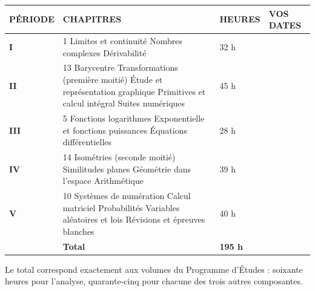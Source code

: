 \vspace{0.6em}
\begin{center}
\setlength{\tabcolsep}{6pt}
\renewcommand{\arraystretch}{1.5}
\begin{tabular}{@{}L{1.5cm} L{6.3cm} L{1.6cm} L{2.5cm}@{}}
\toprule
\textsf{\footnotesize\bfseries PÉRIODE} &
\textsf{\footnotesize\bfseries CHAPITRES} &
\textsf{\footnotesize\bfseries HEURES} &
\textsf{\footnotesize\bfseries VOS DATES} \\
\midrule
\textsf{\bfseries I}   & 1 Limites et continuité  Nombres complexes  Dérivabilité & 32 h & \\
\textsf{\bfseries II}  & 13 Barycentre  Transformations (première moitié)  Étude et représentation graphique  Primitives et calcul intégral  Suites numériques & 45 h & \\
\textsf{\bfseries III} & 5 Fonctions logarithmes  Exponentielle et fonctions puissances  Équations différentielles & 28 h & \\
\textsf{\bfseries IV}  & 14 Isométries (seconde moitié)  Similitudes planes  Géométrie dans l'espace  Arithmétique & 39 h & \\
\textsf{\bfseries V}   & 10 Systèmes de numération  Calcul matriciel  Probabilités  Variables aléatoires et lois \newline Révisions et épreuves blanches & 40 h & \\
\midrule
& \textsf{\bfseries Total} & \textsf{\bfseries 195 h} & \\
\bottomrule
\end{tabular}
\end{center}

\vspace{0.4em}
\noindent Le total correspond exactement aux volumes du Programme d'Études :
soixante heures pour l'analyse, quarante-cinq pour chacune des trois autres
composantes.

